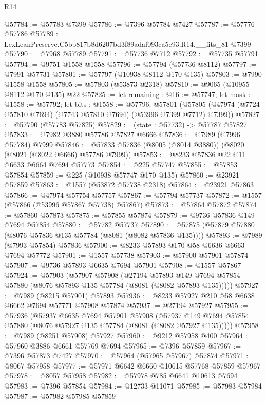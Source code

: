 \begin{lexlean}{R14}
\begin{coremodule}
@57784 := @57783 @7399
@57786 := @7396 @57784 @7427
@57787 := @57776 @57786
@57789 := LexLeanPreserve.C5bb817b8d6207bd3f89adaf093ca5e93.R14.__fits_81 @7399
@57790 := @7968 @57789
@57791 := @57736 @7712
@57792 := @57735 @57791
@57794 := @9751 @1558 @1558
@57796 := @57794 (@57736 @8112)
@57797 := @7991 @57731
@57801 := @57797 (@10938 @8112 @170 @135)
@57803 := @7990 @1558 @1558
@57805 := @57803 (@53873 @2318)
@57810 := @9065 (@10955 @8112 @170 @135) @22
@57825 := let remaining : @16 := @57747;
  let mask : @1558 := @57792;
  let bits : @1558 := @57796;
  @57801 (@57805 (@47974 (@7724 @57810 @7694) (@7743 @57810 @7694) (@53996 @7399 @7712) @7399))
@57827 := @57790 (@57783 @57825)
@57829 := (state : @57732) -> @57787 @57827
@57833 := @7982 @3880 @57786 @57827 @6666
@57836 := @7989 (@7996 @57784) @7999
@57846 := @57833 @57836 (@8005 (@8014 @3880)) (@8020 (@8021 (@8022 @6666) @57786 @7999))
@57853 := @8233 @57836 @22 @11 @6633 @6664 @7694 @57773
@57854 := @225 @57747
@57855 := @57853 @57854
@57859 := @225 (@10938 @57747 @170 @135)
@57860 := @23921 @57859
@57863 := @1557 (@53872 @57738 @2318)
@57864 := @23921 @57863
@57866 := @47974 @57754 @57757
@57867 := @57794 @57737
@57872 := @1557 (@57866 (@53996 @57867 @57738) @57867)
@57873 := @57864 @57872
@57874 := @57860 @57873
@57875 := @57855 @57874
@57879 := @9736 @57836 @149 @7694 @57854
@57880 := @57782 @57737
@57890 := @57875 (@57879 @57880 (@8076 @57836 @135 @57784 (@8081 (@8082 @57836 @135))))
@57893 := @7989 (@7993 @57854) @57836
@57900 := @8233 @57893 @170 @58 @6636 @6663 @7694 @57772
@57901 := @1557 @57738
@57903 := @57900 @57901 @57874
@57907 := @9736 @57893 @6635 @7694 @57901
@57908 := @1557 @57867
@57924 := @57903
    (@57907
      @57908
      (@27194
        @57893
        @149
        @7694
        @57854
        @57880
        (@8076 @57893 @135 @57784 (@8081 (@8082 @57893 @135)))))
@57927 := @7989 (@8215 @57901) @57893
@57936 := @8233 @57927 @210 @58 @6638 @6662 @7694 @57771 @57908 @57874
@57937 := @27194 @57927
@57955 := @57936
    (@57937
      @6635
      @7694
      @57901
      @57908
      (@57937 @149 @7694 @57854 @57880 (@8076 @57927 @135 @57784 (@8081 (@8082 @57927 @135)))))
@57958 := @7989 (@8251 @57908) @57927
@57960 := @9212 @57958 @400
@57964 := @57960 @3886 @6661 @57769 @7694
@57965 := @7396 @57859
@57967 := @7396 @57873 @7427
@57970 := @57964 (@57965 @57967) @57874
@57971 := @8067 @57958
@57977 := @57971 @6642 @6660 @10615 @57768 @57859 @57967
@57978 := @8057 @57958
@57982 := @57978 @785 @6641 @10613 @7694
@57983 := @7396 @57854
@57984 := @12733 @11071
@57985 := @57983 @57984
@57987 := @57982 @57985 @57859

\end{coremodule}
\end{lexlean}
